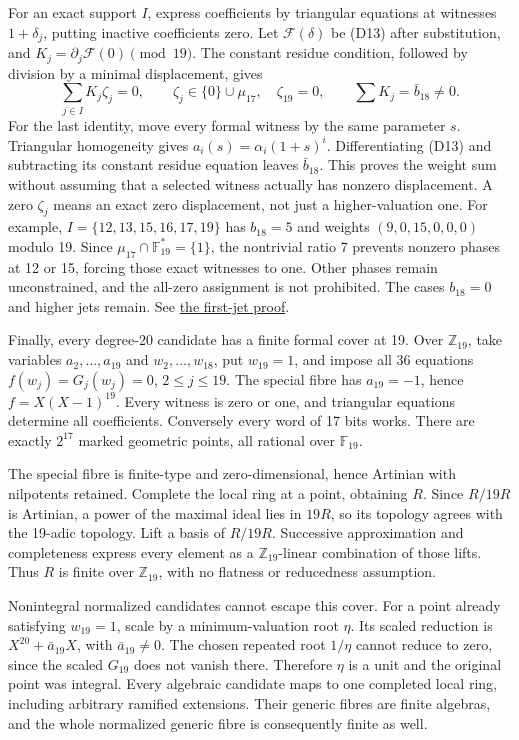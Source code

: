 \documentclass[
  british,
  10pt,
]{article}
\begin{document}
For an exact support \(I\), express coefficients by triangular equations
at witnesses \(1+\delta_j\), putting inactive coefficients zero. Let
\(\mathcal F(\delta)\) be (D13) after substitution, and
\(K_j=\partial_j\mathcal F(0)\pmod{19}\). The constant residue
condition, followed by division by a minimal displacement, gives \[
 \sum_{j\in I}K_j\zeta_j=0,\qquad
 \zeta_j\in\{0\}\cup\mu_{17},\quad\zeta_{19}=0,\qquad
\sum K_j=\bar b_{18}\ne0.                               \tag{D14}
\] For the last identity, move every formal witness by the same
parameter \(s\). Triangular homogeneity gives
\(a_i(s)=\alpha_i(1+s)^i\). Differentiating (D13) and subtracting its
constant residue equation leaves \(\bar b_{18}\). This proves the weight
sum without assuming that a selected witness actually has nonzero
displacement. A zero \(\zeta_j\) means an exact zero displacement, not
just a higher-valuation one. For example, \(I=\{12,13,15,16,17,19\}\)
has \(b_{18}=5\) and weights \((9,0,15,0,0,0)\) modulo 19. Since
\(\mu_{17}\cap\mathbb F_{19}^*=\{1\}\), the nontrivial ratio 7 prevents
nonzero phases at 12 or 15, forcing those exact witnesses to one. Other
phases remain unconstrained, and the all-zero assignment is not
prohibited. The cases \(b_{18}=0\) and higher jets remain. See
\href{evidence/full/global/P19_CLUSTER_FIRST_JET.md}{the first-jet
proof}.

Finally, every degree-20 candidate has a finite formal cover at 19. Over
\(\mathbb Z_{19}\), take variables \(a_2,\ldots,a_{19}\) and
\(w_2,\ldots,w_{18}\), put \(w_{19}=1\), and impose all 36 equations
\(f(w_j)=G_j(w_j)=0\), \(2\le j\le19\). The special fibre has
\(a_{19}=-1\), hence \(f=X(X-1)^{19}\). Every witness is zero or one,
and triangular equations determine all coefficients. Conversely every
word of 17 bits works. There are exactly \(2^{17}\) marked geometric
points, all rational over \(\mathbb F_{19}\).

The special fibre is finite-type and zero-dimensional, hence Artinian
with nilpotents retained. Complete the local ring at a point, obtaining
\(R\). Since \(R/19R\) is Artinian, a power of the maximal ideal lies in
\(19R\), so its topology agrees with the 19-adic topology. Lift a basis
of \(R/19R\). Successive approximation and completeness express every
element as a \(\mathbb Z_{19}\)-linear combination of those lifts. Thus
\(R\) is finite over \(\mathbb Z_{19}\), with no flatness or reducedness
assumption.

Nonintegral normalized candidates cannot escape this cover. For a point
already satisfying \(w_{19}=1\), scale by a minimum-valuation root
\(\eta\). Its scaled reduction is \(X^{20}+\bar a_{19}X\), with
\(\bar a_{19}\ne0\). The chosen repeated root \(1/\eta\) cannot reduce
to zero, since the scaled \(G_{19}\) does not vanish there. Therefore
\(\eta\) is a unit and the original point was integral. Every algebraic
candidate maps to one completed local ring, including arbitrary ramified
extensions. Their generic fibres are finite algebras, and the whole
normalized generic fibre is consequently finite as well.
\end{document}
